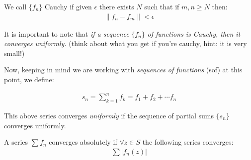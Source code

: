 \begin{defn}
  We call $\{f_n\}$ Cauchy if given $\epsilon$ there exists $N$ such that if $m, n \geq N$ then:
  \begin{align*}
    \| f_n - f_m \| < \epsilon
  \end{align*}
\end{defn}

It is important to note that \textit{if a sequence} $\{f_n\}$ \textit{of functions is Cauchy, 
then it converges uniformly.}  (think about what you get if you're cauchy, hint: it 
is very small!)

Now, keeping in mind we are working with \textit{sequences of functions} (sof) at this point, we define:

\begin{defn}
  \begin{align*}
    s_n = \sum_{k = 1}^{n} f_k = f_1 + f_2 + \cdots f_n
  \end{align*}
\end{defn}

This above series converges \emph{uniformly} if the sequence of partial sums $\{s_n\}$ converges uniformly.

\begin{defn}
  A series $\sum f_n$ converges absolutely if $\forall z \in S$ the following series converges:
  \begin{align*}
    \sum | f_n (z) |
  \end{align*}
\end{defn}

\newpage